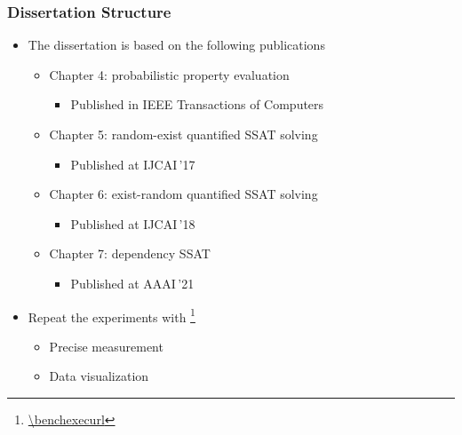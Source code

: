 \begin{frame}
      \frametitle{Dissertation Structure}
      \begin{itemize}
            \item The dissertation is based on the following publications
                  \pause
                  \begin{itemize}
                        \item Chapter 4: probabilistic property evaluation
                              \pause
                              \begin{itemize}
                                    \item Published in IEEE Transactions of Computers~\cite{LeeTC18ProbDesign}
                                          \pause
                              \end{itemize}
                        \item Chapter 5: random-exist quantified SSAT solving
                              \pause
                              \begin{itemize}
                                    \item Published at IJCAI\,'17~\cite{LeeIJCAI17RESSAT}
                                          \pause
                              \end{itemize}
                        \item Chapter 6: exist-random quantified SSAT solving
                              \pause
                              \begin{itemize}
                                    \item Published at IJCAI\,'18~\cite{LeeIJCAI18ERSSAT}
                                          \pause
                              \end{itemize}
                        \item Chapter 7: dependency SSAT
                              \pause
                              \begin{itemize}
                                    \item Published at AAAI\,'21~\cite{LeeAAAI21DSSAT}
                                          \pause
                              \end{itemize}
                  \end{itemize}
            \item Repeat the experiments with \benchexec\footnote{\url{\benchexecurl}}
                  \pause
                  \begin{itemize}
                        \item Precise measurement
                              \pause
                        \item Data visualization
                  \end{itemize}
      \end{itemize}
\end{frame}